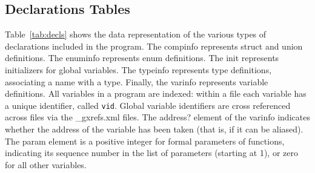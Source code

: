 \documentclass[11pt]{article}
\begin{document}
\subsection{Declarations Tables}

Table~\ref{tab:decls} shows the data representation of the various types of 
declarations included in the program. The compinfo represents struct and union
definitions. The enuminfo represents enum definitions. The init represents
initializers for global variables. The typeinfo represents type definitions,
associating a name with a type. Finally, the varinfo represents variable
definitions. 
All variables in a program are indexed: within a file each variable has a unique
identifier, called {\tt vid}. Global variable identifiers are cross referenced
across files via the \_gxrefs.xml files. The address? element of the varinfo
indicates whether the address of the variable has been taken (that is, if it can
be aliased). The param element is a positive integer for formal parameters of
functions, indicating its sequence number in the list of parameters (starting at
1), or zero for all other variables.
\end{document}
